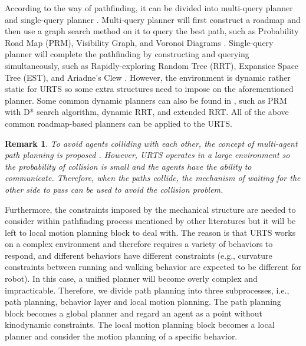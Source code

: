\documentclass{ieeeaccess}
\newtheorem{remark}{Remark}
\begin{document}
According to the way of pathfinding, it can be divided into multi-query planner and single-query planner \cite{elbanhawi2014sampling}. Multi-query planner will first construct a roadmap and then use a graph search method on it to query the best path, such as Probability Road Map (PRM), Visibility Graph, and Voronoi Diagrams \cite{liu2018survey}. Single-query planner will complete the pathfinding by constructing and querying simultaneously,
such as Rapidly-exploring Random Tree (RRT), Expansice Space Tree (EST), and Ariadne's Clew \cite{elbanhawi2014sampling}. However, the environment is dynamic rather static for URTS so some extra structures need to impose on the aforementioned planner. Some common dynamic planners can also be found in \cite{elbanhawi2014sampling}, such as PRM with D* search algorithm, dynamic RRT, and extended RRT. All of the above common roadmap-based planners can be applied to the URTS.

\begin{remark}
    To avoid agents colliding with each other, the concept of multi-agent path planning is proposed \cite{yu2013multi}. However, URTS operates in a large environment so the probability of collision is small and the agents have the ability to communicate. Therefore, when the paths collide, the mechanism of waiting for the other side to pass can be used to avoid the collision problem.
\end{remark}

Furthermore, the constraints imposed by the mechanical structure are needed to consider within pathfinding process mentioned by other literatures but it will be left to local motion planning block to deal with. The reason is that URTS works on a complex environment and therefore requires a variety of behaviors to respond, and different behaviors have different constraints (e.g., curvature constraints between running and walking behavior are expected to be different for robot). In this case, a unified planner will become overly complex and impracticable. Therefore, we divide path planning into three subprocesses, i.e., path planning, behavior layer and local motion planning. The path planning block becomes a global planner and regard an agent as a point without kinodynamic constraints. The local motion planning block becomes a local planner and consider the motion planning of a specific behavior.
\end{document}
